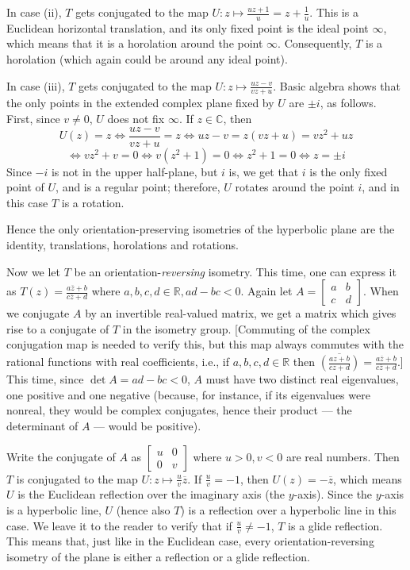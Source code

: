 \documentclass[leqno]{book}
\begin{document}
In case (ii), $T$ gets conjugated to the map $U:z\mapsto\frac{uz+1}u=z+\frac 1u$.  This is a Euclidean horizontal translation, and its only fixed point is the ideal point $\infty$, which means that it is a horolation around the point $\infty$.  Consequently, $T$ is a horolation (which again could be around any ideal point).

In case (iii), $T$ gets conjugated to the map $U:z\mapsto\frac{uz-v}{vz+u}$.  Basic algebra shows that the only points in the extended complex plane fixed by $U$ are $\pm i$, as follows.  First, since $v\ne 0$, $U$ does not fix $\infty$.  If $z\in\mathbb C$, then
$$U(z)=z\iff\frac{uz-v}{vz+u}=z\iff uz-v=z(vz+u)=vz^2+uz$$
$$\iff vz^2+v=0\iff v(z^2+1)=0\iff z^2+1=0\iff z=\pm i$$
Since $-i$ is not in the upper half-plane, but $i$ is, we get that $i$ is the only fixed point of $U$, and is a regular point; therefore, $U$ rotates around the point $i$, and in this case $T$ is a rotation.

Hence the only orientation-preserving isometries of the hyperbolic plane are the identity, translations, horolations and rotations.

Now we let $T$ be an orientation-\emph{reversing} isometry.  This time, one can express it as $T(z)=\frac{a\overline z+b}{c\overline z+d}$ where $a,b,c,d\in\mathbb R,ad-bc<0$.  Again let $A=\begin{bmatrix}a&b\\c&d\end{bmatrix}$.  When we conjugate $A$ by an invertible real-valued matrix, we get a matrix which gives rise to a conjugate of $T$ in the isometry group.  [Commuting of the complex conjugation map is needed to verify this, but this map always commutes with the rational functions with real coefficients, i.e., if $a,b,c,d\in\mathbb  R$ then $\overline{\left(\frac{az+b}{cz+d}\right)}=\frac{a\overline z+b}{c\overline z+d}$.]  This time, since $\det A=ad-bc<0$, $A$ must have two distinct real eigenvalues, one positive and one negative (because, for instance, if its eigenvalues were nonreal, they would be complex conjugates, hence their product \---- the determinant of $A$ \---- would be positive).

Write the conjugate of $A$ as $\begin{bmatrix}u&0\\0&v\end{bmatrix}$ where $u>0,v<0$ are real numbers.  Then $T$ is conjugated to the map $U:z\mapsto\frac uv\overline z$.  If $\frac uv=-1$, then $U(z)=-\overline z$, which means $U$ is the Euclidean reflection over the imaginary axis (the $y$-axis).  Since the $y$-axis is a hyperbolic line, $U$ (hence also $T$) is a reflection over a hyperbolic line in this case.  We leave it to the reader to verify that if $\frac uv\ne -1$, $T$ is a glide reflection.  This means that, just like in the Euclidean case, every orientation-reversing isometry of the plane is either a reflection or a glide reflection.
\end{document}
